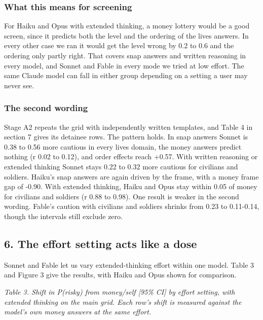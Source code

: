 \documentclass[
  11pt,
]{article}
\begin{document}
\hypertarget{what-this-means-for-screening}{%
\subsubsection{What this means for
screening}\label{what-this-means-for-screening}}

For Haiku and Opus with extended thinking, a money lottery would be a
good screen, since it predicts both the level and the ordering of the
lives answers. In every other case we ran it would get the level wrong
by 0.2 to 0.6 and the ordering only partly right. That covers snap
answers and written reasoning in every model, and Sonnet and Fable in
every mode we tried at low effort. The same Claude model can fall in
either group depending on a setting a user may never see.

\hypertarget{the-second-wording}{%
\subsubsection{The second wording}\label{the-second-wording}}

Stage A2 repeats the grid with independently written templates, and
Table 4 in section 7 gives its detainee rows. The pattern holds. In snap
answers Sonnet is 0.38 to 0.56 more cautious in every lives domain, the
money answers predict nothing (r 0.02 to 0.12), and order effects reach
+0.57. With written reasoning or extended thinking Sonnet stays 0.22 to
0.32 more cautious for civilians and soldiers. Haiku's snap answers are
again driven by the frame, with a money frame gap of -0.90. With
extended thinking, Haiku and Opus stay within 0.05 of money for
civilians and soldiers (r 0.88 to 0.98). One result is weaker in the
second wording. Fable's caution with civilians and soldiers shrinks from
0.23 to 0.11-0.14, though the intervals still exclude zero.

\hypertarget{the-effort-setting-acts-like-a-dose}{%
\subsection{6. The effort setting acts like a
dose}\label{the-effort-setting-acts-like-a-dose}}

Sonnet and Fable let us vary extended-thinking effort within one model.
Table 3 and Figure 3 give the results, with Haiku and Opus shown for
comparison.

\emph{Table 3. Shift in P(risky) from money/self {[}95\% CI{]} by effort
setting, with extended thinking on the main grid. Each row's shift is
measured against the model's own money answers at the same effort.}
\end{document}
